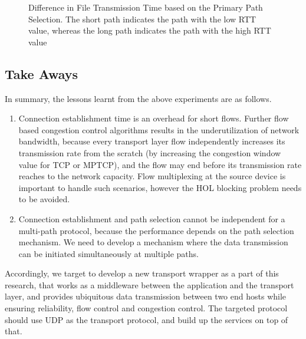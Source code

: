 \begin{figure}[!t]
\begin{center}
\begin{minipage}{0.45\linewidth}
			\label{fig:timeSentOverPathRTT320}
		\end{minipage}
		\caption{\label{fig:timeSentOverPath}Difference in File Transmission Time based on the Primary Path Selection. The short path indicates the path with the low RTT value, whereas the long path indicates the path with the high RTT value}
	\end{center}
\end{figure}

%

\subsection{Take Aways}
In summary, the lessons learnt from the above experiments are as follows.
\begin{enumerate}
	\item Connection establishment time is an overhead for short flows. Further flow based congestion control algorithms results in the underutilization of network bandwidth, because every transport layer flow independently increases its transmission rate from the scratch (by increasing the congestion window value for TCP or MPTCP), and the flow may end before its transmission rate reaches to the network capacity. Flow multiplexing at the source device is important to handle such scenarios, however the HOL blocking problem needs to be avoided. 
	\item Connection establishment and path selection cannot be independent for a multi-path protocol, because the performance depends on the path selection mechanism. We need to develop a mechanism where the data transmission can be initiated simultaneously at multiple paths.   
\end{enumerate}
Accordingly, we target to develop a new transport wrapper as a part of this research, that works as a middleware between the application and the transport layer, and provides ubiquitous data transmission between two end hosts while ensuring reliability, flow control and congestion control.  The targeted protocol should use UDP as the transport protocol, and build up the services on top of that. 

\newpage 